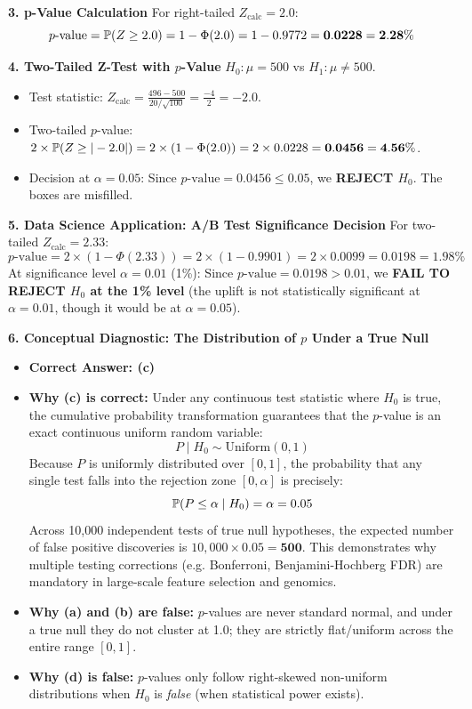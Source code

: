 \textbf{3. p-Value Calculation}
For right-tailed $Z_{\text{calc}} = 2.0$:
$$p\text{-value} = \P(Z \ge 2.0) = 1 - \Phi(2.0) = 1 - 0.9772 = \mathbf{0.0228 = 2.28\%}$$

\textbf{4. Two-Tailed Z-Test with $p$-Value}
$H_0: \mu = 500$ vs $H_1: \mu \neq 500$.
\begin{itemize}
    \item Test statistic: $Z_{\text{calc}} = \frac{496 - 500}{20 / \sqrt{100}} = \frac{-4}{2} = -2.0$.
    \item Two-tailed $p$-value: $2 \times \P(Z \ge |-2.0|) = 2 \times (1 - \Phi(2.0)) = 2 \times 0.0228 = \mathbf{0.0456 = 4.56\%}$.
    \item Decision at $\alpha = 0.05$: Since $p\text{-value} = 0.0456 \le 0.05$, we \textbf{REJECT $H_0$}. The boxes are misfilled.

\end{itemize}
\textbf{5. Data Science Application: A/B Test Significance Decision}
For two-tailed $Z_{\text{calc}} = 2.33$:
$$p\text{-value} = 2 \times (1 - \Phi(2.33)) = 2 \times (1 - 0.9901) = 2 \times 0.0099 = \mathbf{0.0198 = 1.98\%}$$
At significance level $\alpha = 0.01$ (1\%):
Since $p\text{-value} = 0.0198 > 0.01$, we \textbf{FAIL TO REJECT $H_0$ at the 1\% level} (the uplift is not statistically significant at $\alpha=0.01$, though it would be at $\alpha=0.05$).

\textbf{6. Conceptual Diagnostic: The Distribution of $p$ Under a True Null}
\begin{itemize}
    \item \textbf{Correct Answer: (c)}
    \item \textbf{Why (c) is correct:} Under any continuous test statistic where $H_0$ is true, the cumulative probability transformation guarantees that the $p$-value is an exact continuous uniform random variable:
    $$P \mid H_0 \sim \text{Uniform}(0, 1)$$
    Because $P$ is uniformly distributed over $[0, 1]$, the probability that any single test falls into the rejection zone $[0, \alpha]$ is precisely:
    $$\P(P \le \alpha \mid H_0) = \alpha = 0.05$$
    Across 10,000 independent tests of true null hypotheses, the expected number of false positive discoveries is $10,000 \times 0.05 = \mathbf{500}$. This demonstrates why multiple testing corrections (e.g. Bonferroni, Benjamini-Hochberg FDR) are mandatory in large-scale feature selection and genomics.
    \item \textbf{Why (a) and (b) are false:} $p$-values are never standard normal, and under a true null they do not cluster at 1.0; they are strictly flat/uniform across the entire range $[0, 1]$.
    \item \textbf{Why (d) is false:} $p$-values only follow right-skewed non-uniform distributions when $H_0$ is \emph{false} (when statistical power exists).
\end{itemize}

